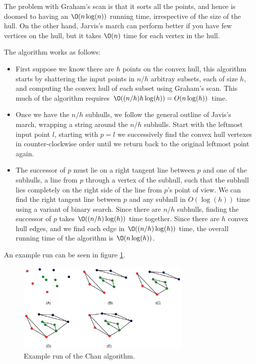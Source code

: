 \documentclass[10pt]{article}
\begin{document}
The problem with Graham's scan is that it sorts all the points, and hence is doomed to having an $\O(n\log(n))$ running time, irrespective of the size of the hull. On the other hand, Jarvis's march can perform better if you have few vertices on the hull, but it takes $\O(n)$ time for each vertex in the hull.

The algorithm works as follows: 

\begin{itemize}
  \item First suppose we know there are $h$ points on the convex hull, this algorithm starts by shattering the input points in $n/h$ arbitray subsets, each of size $h$, and computing the convex hull of each subset using Graham's scan. This much of the algorithm requires $\O((n/h)h\log(h)) = O(n\log(h))$ time.
  \item Once we have the $n/h$ subhulls, we follow the general outline of Javis's march, wrapping a string around the $n/h$ subhulls. Start with the leftmost input point $l$, starting with $p = l$ we successively find the convex hull vertexes in counter-clockwise order until we return back to the original leftmost point again.
  \item The successor of $p$ must lie on a right tangent line between $p$ and one of the subhulls, a line from $p$ through a vertex of the subhull, such that the subhull lies completely on the right side of the line from $p$'s point of view. We can find the right tangent line between $p$ and any subhull in $O(\log(h))$ time using a variant of binary search. Since there are $n/h$ subhulls, finding the successor of $p$ takes $\O((n/h)\log(h))$ time together. Since there are $h$ convex hull edges, and we find each edge in $\O((n/h)\log(h))$ time, the overall running time of the algorithm is $\O(n\log(h))$.
\end{itemize}

An example run can be seen in figure \ref{fig22}.


\begin{figure}[ht]
\centering
\includegraphics[width=0.75\textwidth]{figures/fig22.pdf}
\caption{Example run of the Chan algorithm.}
\label{fig22}
\end{figure}
\end{document}
